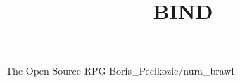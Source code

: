 \documentclass[a4paper,openany]{book}
\title{BIND}
\date{}
\begin{document}
\frontmatter


\frontpage{}%
  {The Open Source RPG}%
  {Boris_Pecikozic/nura_brawl}

\tableofcontents



\mainmatter















\backmatter
\end{document}
